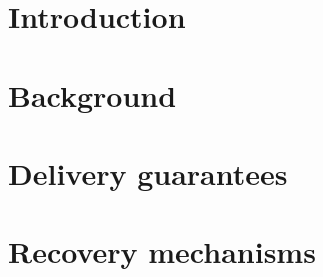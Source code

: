 \documentclass[sigconf]{acmart}
\theoremstyle{remark}
\begin{document}



    \maketitle

    \thispagestyle{empty}

    \section{Introduction}
    

    \section{Background}
    

    \section{Delivery guarantees}
    
    
    \section{Recovery mechanisms}
    
    
\end{document}
